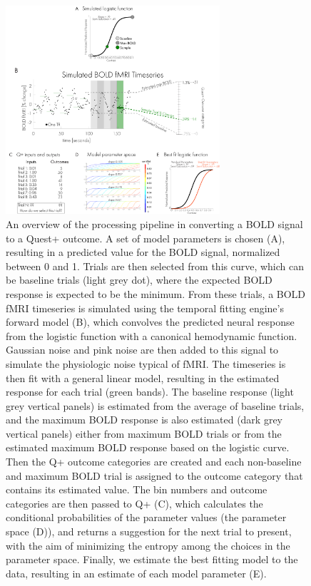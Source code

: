 \documentclass[
  man,floatsintext]{apa6}
\begin{document}
\newpage
\begin{figure}

{\centering \includegraphics[width=300px]{figures/Figure1} 

}

\caption{An overview of the processing pipeline in converting a BOLD signal to a Quest+ outcome. A set of model parameters is chosen (A), resulting in a predicted value for the BOLD signal, normalized between 0 and 1. Trials are then selected from this curve, which can be baseline trials (light grey dot), where the expected BOLD response is expected to be the minimum. From these trials, a BOLD fMRI timeseries is simulated using the temporal fitting engine's forward model (B), which convolves the predicted neural response from the logistic function with a canonical hemodynamic function. Gaussian noise and pink noise are then added to this signal to simulate the physiologic noise typical of fMRI. The timeseries is then fit with a general linear model, resulting in the estimated response for each trial (green bands). The baseline response (light grey vertical panels) is estimated from the average of baseline trials, and the maximum BOLD response is also estimated (dark grey vertical panels) either from maximum BOLD trials or from the estimated maximum BOLD response based on the logistic curve. Then the Q+ outcome categories are created and each non-baseline and maximum BOLD trial is assigned to the outcome category that contains its estimated value. The bin numbers and outcome categories are then passed to Q+ (C), which calculates the conditional probabilities of the parameter values (the parameter space (D)), and returns a suggestion for the next trial to present, with the aim of minimizing the entropy among the choices in the parameter space. Finally, we estimate the best fitting model to the data, resulting in an estimate of each model parameter (E).
\newpage}\label{fig:methods-figure}
\end{figure}
\end{document}
